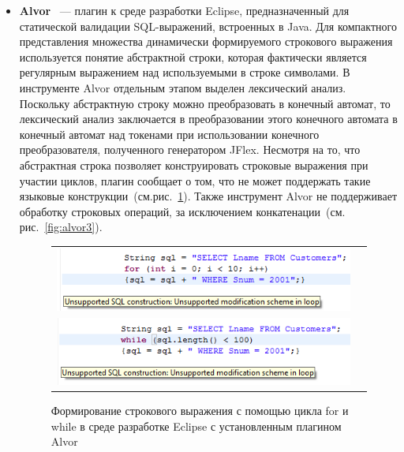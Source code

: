 \begin{itemize}    
\item \textbf{Alvor}~\cite{Alvor, AlvorUrl} {---} плагин к среде разработки Eclipse, предназначенный для статической валидации SQL-выражений, встроенных в Java. Для компактного представления множества динамически формируемого строкового выражения используется понятие абстрактной строки, которая фактически является регулярным выражением над используемыми в строке символами. В инструменте Alvor отдельным этапом выделен лексический анализ. Поскольку абстрактную строку можно преобразовать в конечный автомат, то лексический анализ заключается в преобразовании этого конечного автомата в конечный автомат над токенами при  использовании конечного преобразователя, полученного генератором JFlex. Несмотря на то, что абстрактная строка позволяет конструировать строковые выражения при участии циклов, плагин сообщает о том, что не может поддержать такие языковые конструкции~(см.рис.~\ref{fig:alvor2}). Также инструмент Alvor не поддерживает обработку строковых операций, за исключением конкатенации~(см. рис.~\ref{fig:alvor3}).


\begin{figure}[h!]
\begin{center}
\begin{tabular}{  c  c }
\begin{minipage}{\textwidth}
  \includegraphics[width=\linewidth]{Polubelova/alvor2.png}
\end{minipage}\\    
\begin{minipage}{\textwidth}
  \includegraphics[width=\linewidth]{Polubelova/alvor1.png}
\end{minipage}
\end{tabular}    
\caption{Формирование строкового выражения с помощью цикла for и while в среде разработке Eclipse с установленным плагином Alvor}
\label{fig:alvor2} 
\end{center}
\end{figure}


\end{itemize}

